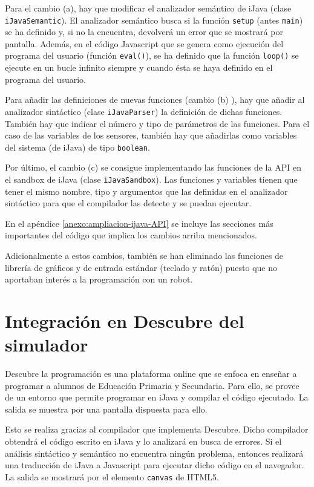 Para el cambio (a), hay que modificar el analizador semántico de iJava (clase \texttt{iJavaSemantic}). El analizador semántico busca si la función \texttt{setup} (antes \texttt{main}) se ha definido y, si no la encuentra, devolverá un error que se mostrará por pantalla. Además, en el código Javascript que se genera como ejecución del programa del usuario (función \texttt{eval()}), se ha definido que la función \texttt{loop()} se ejecute en un bucle infinito siempre y cuando ésta se haya definido en el programa del usuario.

Para añadir las definiciones de nuevas funciones (cambio (b) ), hay que añadir al analizador sintáctico (clase \texttt{iJavaParser}) la definición de dichas funciones. También hay que indicar el número y tipo de parámetros de las funciones. Para el caso de las variables de los sensores, también hay que añadirlas como variables del sistema (de iJava) de tipo \texttt{boolean}.

Por último, el cambio (c) se consigue implementando las funciones de la API en el sandbox de iJava (clase \texttt{iJavaSandbox}). Las funciones y variables tienen que tener el mismo nombre, tipo y argumentos que las definidas en el analizador sintáctico para que el compilador las detecte y se puedan ejecutar.

En el apéndice \ref{anexo:ampliacion-ijava-API} se incluye las secciones más importantes del código que implica los cambios arriba mencionados.


Adicionalmente a estos cambios, también se han eliminado las funciones de librería de gráficos y de entrada estándar (teclado y ratón) puesto que no aportaban interés a la programación con un robot. 


\section{Integración en Descubre del simulador}
\label{sec:integracion-descubre}


Descubre la programación\cite{descubre} es una plataforma online que se enfoca en enseñar a programar a alumnos de Educación Primaria y Secundaria. Para ello, se provee de un entorno que permite programar en iJava\cite{sanchez2009ijava} y compilar el código ejecutado. La salida se muestra por una pantalla dispuesta para ello.

Esto se realiza gracias al compilador que implementa Descubre. Dicho compilador obtendrá el código escrito en iJava y lo analizará en busca de errores. Si el análisis sintáctico y semántico no encuentra ningún problema, entonces realizará una traducción de iJava a Javascript para ejecutar dicho código en el navegador. La salida se mostrará por el elemento \texttt{canvas} de HTML5.

